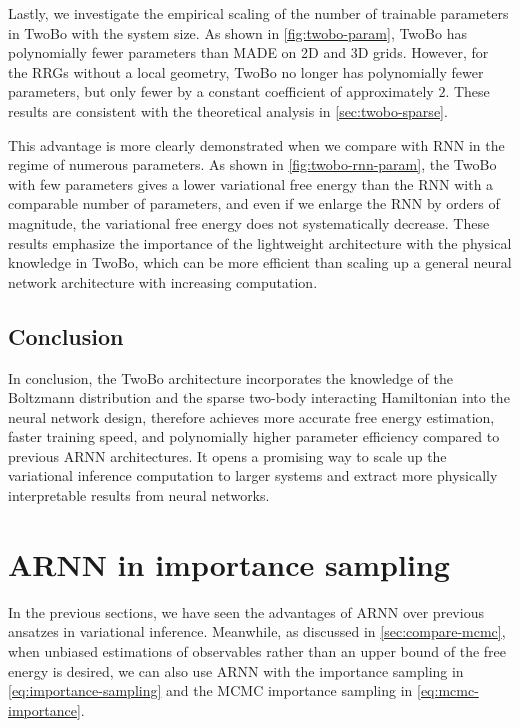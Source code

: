 Lastly, we investigate the empirical scaling of the number of trainable parameters in TwoBo with the system size. As shown in \cref{fig:twobo-param}, TwoBo has polynomially fewer parameters than MADE on 2D and 3D grids. However, for the RRGs without a local geometry, TwoBo no longer has polynomially fewer parameters, but only fewer by a constant coefficient of approximately $2$. These results are consistent with the theoretical analysis in \cref{sec:twobo-sparse}.

\vfill

\newpage

This advantage is more clearly demonstrated when we compare with RNN in the regime of numerous parameters. As shown in \cref{fig:twobo-rnn-param}, the TwoBo with few parameters gives a lower variational free energy than the RNN with a comparable number of parameters, and even if we enlarge the RNN by orders of magnitude, the variational free energy does not systematically decrease. These results emphasize the importance of the lightweight architecture with the physical knowledge in TwoBo, which can be more efficient than scaling up a general neural network architecture with increasing computation.

\subsection{Conclusion}

In conclusion, the TwoBo architecture incorporates the knowledge of the Boltzmann distribution and the sparse two-body interacting Hamiltonian into the neural network design, therefore achieves more accurate free energy estimation, faster training speed, and polynomially higher parameter efficiency compared to previous ARNN architectures. It opens a promising way to scale up the variational inference computation to larger systems and extract more physically interpretable results from neural networks.

\section{ARNN in importance sampling}
\label{sec:arnn-mcmc}

In the previous sections, we have seen the advantages of ARNN over previous ansatzes in variational inference. Meanwhile, as discussed in \cref{sec:compare-mcmc}, when unbiased estimations of observables rather than an upper bound of the free energy is desired, we can also use ARNN with the importance sampling in \cref{eq:importance-sampling} and the MCMC importance sampling in \cref{eq:mcmc-importance}.

